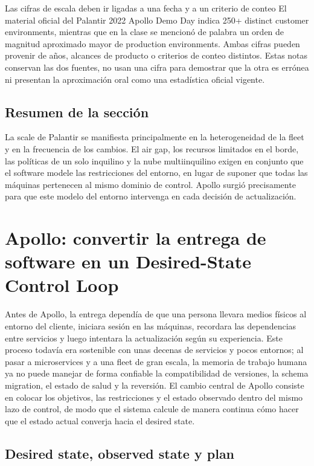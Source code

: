\documentclass[a4paper]{article}
\begin{document}
\begin{warningbox}{Las cifras de escala deben ir ligadas a una fecha y a un criterio de conteo}
El material oficial del Palantir 2022 Apollo Demo Day indica 250+ distinct customer environments, mientras que en la clase se mencionó de palabra un orden de magnitud aproximado mayor de production environments. Ambas cifras pueden provenir de años, alcances de producto o criterios de conteo distintos. Estas notas conservan las dos fuentes, no usan una cifra para demostrar que la otra es errónea ni presentan la aproximación oral como una estadística oficial vigente.
\end{warningbox}

\subsection{Resumen de la sección}

La scale de Palantir se manifiesta principalmente en la heterogeneidad de la fleet y en la frecuencia de los cambios. El air gap, los recursos limitados en el borde, las políticas de un solo inquilino y la nube multiinquilino exigen en conjunto que el software modele las restricciones del entorno, en lugar de suponer que todas las máquinas pertenecen al mismo dominio de control. Apollo surgió precisamente para que este modelo del entorno intervenga en cada decisión de actualización.
\section{Apollo: convertir la entrega de software en un Desired-State Control Loop}

Antes de Apollo, la entrega dependía de que una persona llevara medios físicos al entorno del cliente, iniciara sesión en las máquinas, recordara las dependencias entre servicios y luego intentara la actualización según su experiencia. Este proceso todavía era sostenible con unas decenas de servicios y pocos entornos; al pasar a microservices y a una fleet de gran escala, la memoria de trabajo humana ya no puede manejar de forma confiable la compatibilidad de versiones, la schema migration, el estado de salud y la reversión. El cambio central de Apollo consiste en colocar los objetivos, las restricciones y el estado observado dentro del mismo lazo de control, de modo que el sistema calcule de manera continua cómo hacer que el estado actual converja hacia el desired state.

\subsection{Desired state, observed state y plan}
\end{document}
